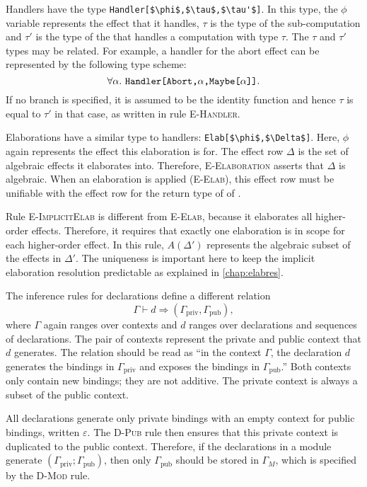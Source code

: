 Handlers have the type \lstinline[mathescape]{Handler[$\phi$,$\tau$,$\tau'$]}. In this type, the $\phi$ variable represents the effect that it handles, $\tau$ is the type of the sub-computation and $\tau'$ is the type of the  that handles a computation with type $\tau$. The $\tau$ and $\tau'$ types may be related. For example, a handler for the abort effect can be represented by the following type scheme:
\[ \forall \alpha.\ \kw{Handler[Abort,}\alpha\kw{,Maybe[}\alpha\kw{]]}. \]
If no  branch is specified, it is assumed to be the identity function and hence $\tau$ is equal to $\tau'$ in that case, as written in rule \textsc{E-Handler}.

Elaborations have a similar type to handlers: \lstinline[mathescape]{Elab[$\phi$,$\Delta$]}. Here, $\phi$ again represents the effect this elaboration is for. The effect row $\Delta$ is the set of algebraic effects it elaborates into. Therefore, \textsc{E-Elaboration} asserts that $\Delta$ is algebraic. When an elaboration is applied (\textsc{E-Elab}), this effect row must be unifiable with the effect row for the return type of of .

Rule \textsc{E-ImplicitElab} is different from \textsc{E-Elab}, because it elaborates all higher-order effects. Therefore, it requires that exactly one elaboration is in scope for each higher-order effect. In this rule, $A(\Delta')$ represents the algebraic subset of the effects in $\Delta'$. The uniqueness is important here to keep the implicit elaboration resolution predictable as explained in \cref{chap:elabres}.

The inference rules for declarations define a different relation
\[ \Gamma \vdash d \Rightarrow (\Gamma_{\text{priv}}, \Gamma_{\text{pub}}), \]
where $\Gamma$ again ranges over contexts and $d$ ranges over declarations and sequences of declarations. The pair of contexts represent the private and public context that $d$ generates. The relation should be read as ``in the context $\Gamma$, the declaration $d$ generates the bindings in $\Gamma_{\text{priv}}$ and exposes the bindings in $\Gamma_{\text{pub}}$.'' Both contexts only contain new bindings; they are not additive. The private context is always a subset of the public context.

All declarations generate only private bindings with an empty context for public bindings, written $\varepsilon$. The \textsc{D-Pub} rule then ensures that this private context is duplicated to the public context. Therefore, if the declarations in a module generate $(\Gamma_{\text{priv}};\Gamma_{\text{pub}})$, then only $\Gamma_{\text{pub}}$ should be stored in $\Gamma_M$, which is specified by the \textsc{D-Mod} rule.

